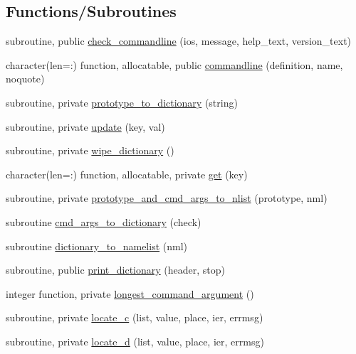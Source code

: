 \subsection*{Functions/\+Subroutines}
\begin{DoxyCompactItemize}
\item 
subroutine, public \mbox{\hyperlink{namespacem__cli_a62056f0c153eb63cb0b11a21edb028cd}{check\+\_\+commandline}} (ios, message, help\+\_\+text, version\+\_\+text)
\item 
character(len=\+:) function, allocatable, public \mbox{\hyperlink{namespacem__cli_a4f639b0c4bf16930fc1c5858ed4196a3}{commandline}} (definition, name, noquote)
\item 
subroutine, private \mbox{\hyperlink{namespacem__cli_a8c62537a2d224364c9cb30005be819e9}{prototype\+\_\+to\+\_\+dictionary}} (string)
\item 
subroutine, private \mbox{\hyperlink{namespacem__cli_a9b7676d796e5cb878ecd9294b8a689cb}{update}} (key, val)
\item 
subroutine, private \mbox{\hyperlink{namespacem__cli_a3c1b30406fc692841826be979726bb1b}{wipe\+\_\+dictionary}} ()
\item 
character(len=\+:) function, allocatable, private \mbox{\hyperlink{namespacem__cli_a45783c194a1484042f63c58b180ca8df}{get}} (key)
\item 
subroutine, private \mbox{\hyperlink{namespacem__cli_ac77d70573b34ade2079cc4004a6acba5}{prototype\+\_\+and\+\_\+cmd\+\_\+args\+\_\+to\+\_\+nlist}} (prototype, nml)
\item 
subroutine \mbox{\hyperlink{namespacem__cli_a89a63254465b02048f09541e51974764}{cmd\+\_\+args\+\_\+to\+\_\+dictionary}} (check)
\item 
subroutine \mbox{\hyperlink{namespacem__cli_a7e5041efcad56387232475a3ae728634}{dictionary\+\_\+to\+\_\+namelist}} (nml)
\item 
subroutine, public \mbox{\hyperlink{namespacem__cli_a5b6abaf1d5aec5e918be0759df29c849}{print\+\_\+dictionary}} (header, stop)
\item 
integer function, private \mbox{\hyperlink{namespacem__cli_aaf5504d3b48696a9d22fa5773c5a7d15}{longest\+\_\+command\+\_\+argument}} ()
\item 
subroutine, private \mbox{\hyperlink{namespacem__cli_ade3d1e36f0fc6a47b5469dcd8ade5312}{locate\+\_\+c}} (list, value, place, ier, errmsg)
\item 
subroutine, private \mbox{\hyperlink{namespacem__cli_a4187c24a2abf5cc630232965637493e8}{locate\+\_\+d}} (list, value, place, ier, errmsg)

\end{DoxyCompactItemize}
